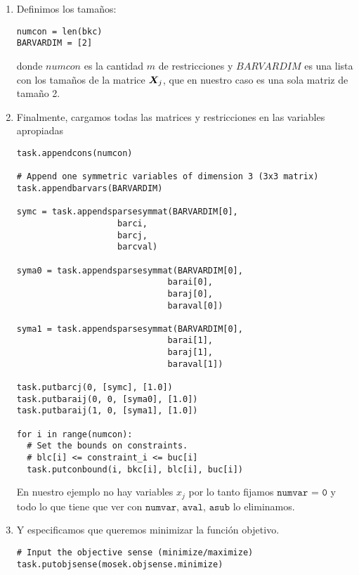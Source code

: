 \documentclass[11pt]{article}
\begin{document}
\begin{enumerate}
\item Definimos los tamaños:
\begin{lstlisting}
numcon = len(bkc)
BARVARDIM = [2]
\end{lstlisting}
donde $numcon$ es la cantidad $m$ de restricciones y $BARVARDIM$ es una lista con los tamaños de la matrice $\bm{X}_j$, que en nuestro caso es una sola matriz de tamaño 2.

\item Finalmente, cargamos todas las matrices y restricciones en las variables apropiadas

\begin{lstlisting}
task.appendcons(numcon)

# Append one symmetric variables of dimension 3 (3x3 matrix)
task.appendbarvars(BARVARDIM)

symc = task.appendsparsesymmat(BARVARDIM[0],
                    barci,
                    barcj,
                    barcval)

syma0 = task.appendsparsesymmat(BARVARDIM[0],
                              barai[0],
                              baraj[0],
                              baraval[0])

syma1 = task.appendsparsesymmat(BARVARDIM[0],
                              barai[1],
                              baraj[1],
                              baraval[1])

task.putbarcj(0, [symc], [1.0])
task.putbaraij(0, 0, [syma0], [1.0])
task.putbaraij(1, 0, [syma1], [1.0])

for i in range(numcon):
  # Set the bounds on constraints.
  # blc[i] <= constraint_i <= buc[i]
  task.putconbound(i, bkc[i], blc[i], buc[i])
\end{lstlisting}

En nuestro ejemplo no hay variables $x_j$ por lo tanto fijamos $\texttt{numvar = 0}$ y todo lo que tiene que ver con $\texttt{numvar}$, $\texttt{aval}$, $\texttt{asub}$ lo eliminamos.

\item Y especificamos que queremos minimizar la función objetivo.

\begin{lstlisting}
# Input the objective sense (minimize/maximize)
task.putobjsense(mosek.objsense.minimize)
\end{lstlisting}

\end{enumerate}
\end{document}

